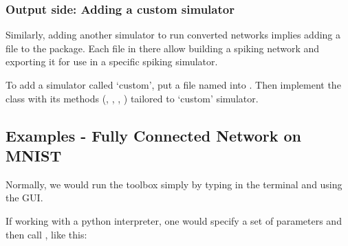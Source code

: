 \documentclass[letterpaper,10pt,english]{sphinxmanual}
\begin{document}
\subsubsection{Output side: Adding a custom simulator}
\label{getting_started:output-side-adding-a-custom-simulator}
Similarly, adding another simulator to run converted networks implies adding a file to the
 package. Each file in there allow building a spiking network
and exporting it for use in a specific spiking simulator.

To add a simulator called `custom', put a file named  into . Then implement the class  with its
methods (, , , ) tailored to `custom' simulator.


\subsection{Examples - Fully Connected Network on MNIST}
\label{getting_started:examples-fully-connected-network-on-mnist}
Normally, we would run the toolbox simply by typing  in the terminal
and using the GUI.

If working with a python interpreter, one would specify a set of parameters and
then call , like this:
\end{document}
